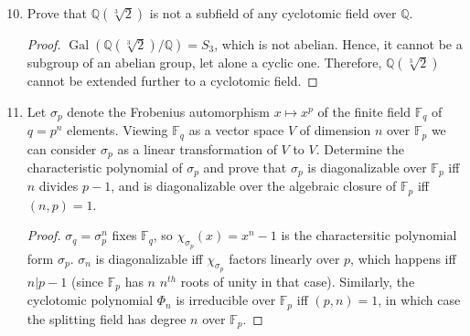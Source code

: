 \documentclass{report}
\newcommand{\Q}{\mathbb{Q}}
\newcommand{\F}{\mathbb{F}}
\DeclareMathOperator{\Gal}{Gal}
\begin{document}
\begin{enumerate}
		\setcounter{enumi}{9}
	\item Prove that $\Q(\sqrt[3]{2})$ is not a subfield of any cyclotomic field over $\Q$.
		\begin{proof}
			$\Gal(\Q(\sqrt[3]{2})/\Q)=S_3$, which is not abelian. Hence, it cannot be a subgroup of an abelian group, let alone a cyclic one.
			Therefore, $\Q(\sqrt[3]{2})$ cannot be extended further to a cyclotomic field.
		\end{proof}
		\setcounter{enumi}{11}
	\item Let $\sigma_p$ denote the Frobenius automorphism $x\mapsto x^p$ of the finite field $\F_q$ of $q=p^n$ elements.
		Viewing $\F_q$ as a vector space $V$ of dimension $n$ over $\F_p$ we can consider $\sigma_p$ as a linear transformation of $V$ to $V$.
		Determine the characteristic polynomial of $\sigma_p$ and prove that $\sigma_p$ is diagonalizable over $\F_p$ iff $n$ divides $p-1$,
		and is diagonalizable over the algebraic closure of $\F_p$ iff $(n,p)=1$.
		\begin{proof}
			$\sigma_q=\sigma_p^n$ fixes $\F_q$, so $\chi_{\sigma_p}(x)=x^n-1$ is the charactersitic polynomial form $\sigma_p$.
			$\sigma_n$ is diagonalizable iff $\chi_{\sigma_p}$ factors linearly over $p$, which happens iff $n|p-1$ (since $\F_p$ has $n$ $n^{th}$ roots of unity in that case).
			Similarly, the cyclotomic polynomial $\Phi_n$ is irreducible over $\F_p$ iff $(p,n)=1$, in which case the splitting field has degree $n$ over $\F_p$. 
		\end{proof}
		
\end{enumerate}
\end{document}
